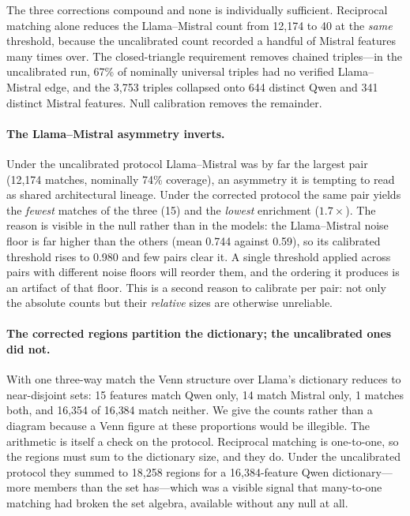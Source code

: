 \documentclass[11pt]{article}
\begin{document}
The three corrections compound and none is individually sufficient. Reciprocal matching
alone reduces the Llama--Mistral count from 12{,}174 to 40 at the \emph{same} threshold,
because the uncalibrated count recorded a handful of Mistral features many times over. The
closed-triangle requirement removes chained triples---in the uncalibrated run, 67\% of
nominally universal triples had no verified Llama--Mistral edge, and the 3{,}753 triples
collapsed onto 644 distinct Qwen and 341 distinct Mistral features. Null calibration
removes the remainder.

\paragraph{The Llama--Mistral asymmetry inverts.} Under the uncalibrated protocol
Llama--Mistral was by far the largest pair (12{,}174 matches, nominally 74\% coverage),
an asymmetry it is tempting to read as shared architectural lineage. Under the corrected
protocol the same pair yields the \emph{fewest} matches of the three (15) and the
\emph{lowest} enrichment ($1.7\times$). The reason is visible in the null rather than in
the models: the Llama--Mistral noise floor is far higher than the others (mean 0.744
against 0.59), so its calibrated threshold rises to 0.980 and few pairs clear it. A
single threshold applied across pairs with different noise floors will reorder them, and
the ordering it produces is an artifact of that floor. This is a second reason to
calibrate per pair: not only the absolute counts but their \emph{relative} sizes are
otherwise unreliable.

\paragraph{The corrected regions partition the dictionary; the uncalibrated ones did
not.} With one three-way match the Venn structure over Llama's dictionary reduces to
near-disjoint sets: 15 features match Qwen only, 14 match Mistral only, 1 matches both,
and 16{,}354 of 16{,}384 match neither. We give the counts rather than a diagram because
a Venn figure at these proportions would be illegible. The arithmetic is itself a check
on the protocol. Reciprocal matching is one-to-one, so the regions must sum to the
dictionary size, and they do. Under the uncalibrated protocol they summed to 18{,}258
regions for a 16{,}384-feature Qwen dictionary---more members than the set has---which
was a visible signal that many-to-one matching had broken the set algebra, available
without any null at all.
\end{document}
